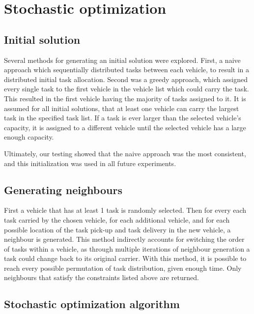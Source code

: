 \documentclass[11pt]{article}
\begin{document}
\section{Stochastic optimization}

\subsection{Initial solution}
Several methods for generating an initial solution were explored. First, a naive approach which sequentially distributed tasks between each vehicle, to result in a distributed initial task allocation. Second was a greedy approach, which assigned every single task to the first vehicle in the vehicle list which could carry the task. This resulted in the first vehicle having the majority of tasks assigned to it. It is assumed for all initial solutions, that at least one vehicle can carry the largest task in the specified task list. If a task is ever larger than the selected vehicle's capacity, it is assigned to a different vehicle until the selected vehicle has a large enough capacity.  

Ultimately, our testing showed that the naive approach was the most consistent, and this initialization was used in all future experiments. 

\subsection{Generating neighbours}
First a vehicle that has at least 1 task is randomly selected. Then for every each task carried by the chosen vehicle, for each additional vehicle, and for each possible location of the task pick-up and task delivery in the new vehicle, a neighbour is generated. This method indirectly accounts for switching the order of tasks within a vehicle, as through multiple iterations of neighbour generation a task could change back to its original carrier. With this method, it is possible to reach every possible permutation of task distribution, given enough time. Only neighbours that satisfy the constraints listed above are returned. 

\subsection{Stochastic optimization algorithm}
\end{document}
